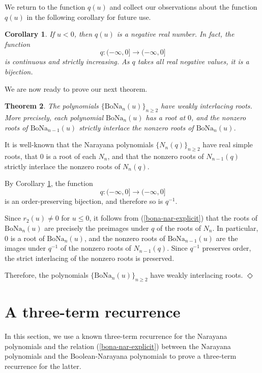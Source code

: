 \documentclass[11pt]{article}
\newcommand{\qed}{\mbox{$\Diamond$}\vspace{\baselineskip}}
\newtheorem{theorem}{Theorem}[section]
\newtheorem{corollary}[theorem]{Corollary}
\newenvironment{proof}{\noindent {\bf Proof:}}{{\qed}}
\begin{document}
We return to the function $q(u)$ and
 collect our observations about the function $q(u)$ in the following corollary for future use.
\begin{corollary} \label{properties}
If $u<0$, then $q(u)$ is a negative real number. In fact, the function 
\[q:(-\infty,0]\to(-\infty,0]\] is continuous and strictly increasing. As $q$ takes all real negative values,  it is a bijection.
\end{corollary}

We are now ready to prove our next theorem.

\begin{theorem} \label{interlacing}
The polynomials \(\{\mathrm{BoNa}_n(u)\}_{n\ge 2}\) have weakly interlacing roots. More precisely,
each polynomial \(\mathrm{BoNa}_n(u)\) has a root at \(0\), and the nonzero roots of
\(\mathrm{BoNa}_{n-1}(u)\) strictly interlace the nonzero roots of \(\mathrm{BoNa}_n(u)\).
\end{theorem}

\begin{proof}
It is well-known \cite{kostov} that the Narayana polynomials \(\{N_n(q)\}_{n\ge 2}\) have real simple roots,
that \(0\) is a root of each \(N_n\), and that the nonzero roots of \(N_{n-1}(q)\) strictly interlace
the nonzero roots of \(N_n(q)\).

By Corollary \ref{properties}, the function
\[
q:(-\infty,0]\to(-\infty,0]
\]
is an order-preserving bijection, and therefore so is \(q^{-1}\).

Since \(r_2(u)\neq 0\) for \(u\le 0\), it follows from (\ref{bona-nar-explicit}) that the roots of \(\mathrm{BoNa}_n(u)\) are precisely
the preimages under \(q\) of the roots of \(N_n\). In particular, \(0\) is a root of \(\mathrm{BoNa}_n(u)\),
and the nonzero roots of \(\mathrm{BoNa}_{n-1}(u)\) are the images under \(q^{-1}\) of the nonzero roots
of \(N_{n-1}(q)\). Since \(q^{-1}\) preserves order, the strict interlacing of the nonzero roots is preserved.

Therefore, the polynomials \(\{\mathrm{BoNa}_n(u)\}_{n\ge2}\) have weakly interlacing roots.
\end{proof}

\section{A three-term recurrence} \label{rec}
In this section, we use a known three-term recurrence for the Narayana polynomials and the relation (\ref{bona-nar-explicit}) between the Narayana
polynomials and the Boolean-Narayana polynomials to prove a three-term recurrence for the latter.
\end{document}
